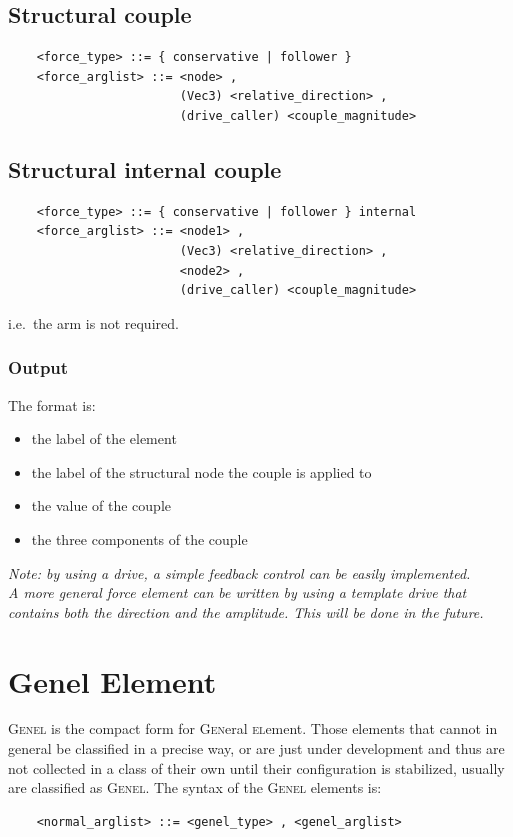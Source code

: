 \subsection{Structural couple}
\begin{verbatim}
    <force_type> ::= { conservative | follower } 
    <force_arglist> ::= <node> ,
                        (Vec3) <relative_direction> ,  
                        (drive_caller) <couple_magnitude>
\end{verbatim}

\subsection{Structural internal couple}
\begin{verbatim}
    <force_type> ::= { conservative | follower } internal
    <force_arglist> ::= <node1> ,
                        (Vec3) <relative_direction> ,  
                        <node2> ,
                        (drive_caller) <couple_magnitude>
\end{verbatim}
i.e.\ the arm is not required. 

\subsubsection{Output}
The format is:
\begin{itemize}
    \item the label of the element
    \item the label of the structural node the couple is applied to
    \item the value of the couple
    \item the three components of the couple
\end{itemize}


\noindent
{\em 
Note: by using a  drive, a simple feedback control can be easily
implemented. \\
A more general force element can be written by using a template drive
that contains both the direction and the amplitude. This will be done in the
future. 
}





\section{Genel Element}
\textsc{Genel} is the compact form for \textsc{Gen}eral \textsc{el}ement.
Those elements that cannot in general be classified in a precise way, 
or are just under development and thus are not collected in a class 
of their own until their configuration is stabilized, usually are
classified as \textsc{Genel}.
The syntax of the \textsc{Genel} elements is:
\begin{verbatim}
    <normal_arglist> ::= <genel_type> , <genel_arglist>
\end{verbatim}

